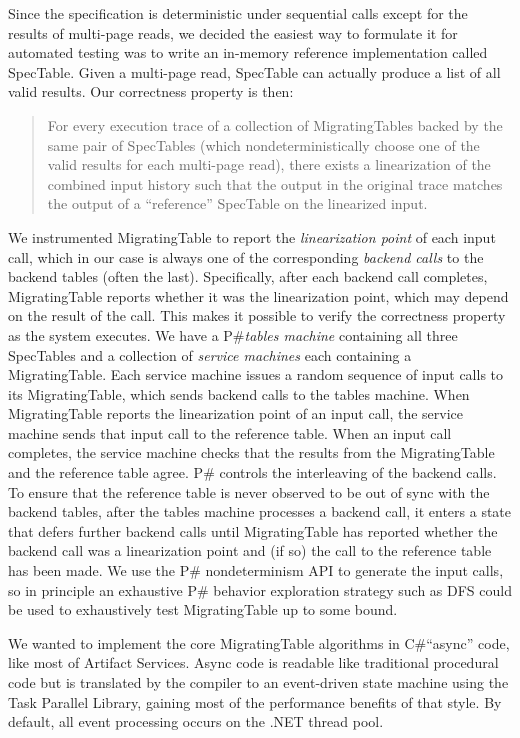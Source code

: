 \documentclass{sig-alternate}
\newcommand{\psharp}{P\#\xspace}
\newcommand{\csharp}{C\#\xspace}
\begin{document}
Since the specification is deterministic under sequential calls except for the results of multi-page reads, we decided the easiest way to formulate it for automated testing was to write an in-memory reference implementation called SpecTable.  Given a multi-page read, SpecTable can actually produce a list of all valid results.  Our correctness property is then:
\begin{quote}
For every execution trace of a collection of MigratingTables backed by the same pair of SpecTables (which nondeterministically choose one of the valid results for each multi-page read), there exists a linearization of the combined input history such that the output in the original trace matches the output of a ``reference'' SpecTable on the linearized input.
\end{quote}
%
\def\term#1{\emph{#1}}
We instrumented MigratingTable to report the \term{linearization point} of each input call, which in our case is always one of the corresponding \term{backend calls} to the backend tables (often the last).  Specifically, after each backend call completes, MigratingTable reports whether it was the linearization point, which may depend on the result of the call.  This makes it possible to verify the correctness property as the system executes.  We have a \psharp \term{tables machine} containing all three SpecTables and a collection of \term{service machines} each containing a MigratingTable.  Each service machine issues a random sequence of input calls to its MigratingTable, which sends backend calls to the tables machine.  When MigratingTable reports the linearization point of an input call, the service machine sends that input call to the reference table.  When an input call completes, the service machine checks that the results from the MigratingTable and the reference table agree.  \psharp controls the interleaving of the backend calls.  To ensure that the reference table is never observed to be out of sync with the backend tables, after the tables machine processes a backend call, it enters a state that defers further backend calls until MigratingTable has reported whether the backend call was a linearization point and (if so) the call to the reference table has been made.  We use the \psharp nondeterminism API to generate the input calls, so in principle an exhaustive \psharp behavior exploration strategy such as DFS could be used to exhaustively test MigratingTable up to some bound.

We wanted to implement the core MigratingTable algorithms in \csharp ``async'' code, like most of Artifact Services.  Async code is readable like traditional procedural code but is translated by the compiler to an event-driven state machine using the Task Parallel Library, gaining most of the performance benefits of that style.  By default, all event processing occurs on the .NET thread pool.
\end{document}
